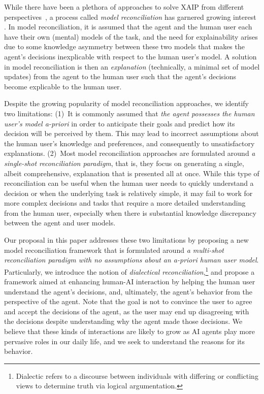 \documentclass{ecai}
\begin{document}
While there have been a plethora of approaches to solve XAIP from different perspectives~\cite{chakraborti2020emerging}, a process called \emph{model reconciliation} has garnered growing interest \cite{chakraborti2017plan, sreedharan2018handling, ijcai2019, son2021model, vas21, vasileioulogic}. In model reconciliation, it is assumed that the agent and the human user each have their own (mental) models of the task, and the need for explainability arises due to some knowledge asymmetry between these two models that makes the agent's decisions inexplicable with respect to the human user's model. A solution in model reconciliation is then an \emph{explanation} (technically, a minimal set of model updates) from the agent to the human user such that the agent's decisions become explicable to the human user.

Despite the growing popularity of model reconciliation approaches, we identify two limitations: (1)~It is commonly assumed that \emph{the agent possesses the human user's model a-priori} in order to anticipate their goals and predict how its decision will be perceived by them. This may lead to incorrect assumptions about the human user's knowledge and preferences, and consequently to unsatisfactory explanations. (2)~Most model reconciliation approaches are formulated around \emph{a single-shot reconciliation paradigm}, that is, they focus on generating a single, albeit comprehensive, explanation that is presented all at once. While this type of reconciliation can be useful when the human user needs to quickly understand a decision or when the underlying task is relatively simple, it may fail to work for more complex decisions and tasks that require a more detailed understanding from the human user, especially when there is substantial knowledge discrepancy between the agent and user models.

Our proposal in this paper addresses these two limitations by proposing a new model reconciliation framework that is formulated around \emph{a multi-shot reconciliation paradigm with no assumptions about an a-priori human user model}. Particularly, we introduce the notion of \emph{dialectical reconciliation},\footnote{Dialectic refers to a discourse between individuals with differing or conflicting views to determine truth via logical argumentation.} and propose a framework aimed at enhancing human-AI interaction by helping the human user understand the agent's decisions, and, ultimately, the agent's behavior from the perspective of the agent. Note that the goal is not to convince the user to agree and accept the decisions of the agent, as the user may end up disagreeing with the decisions despite understanding why the agent made those decisions. We believe that these kinds of interactions are likely to grow as AI agents play more pervasive roles in our daily life, and we seek to understand the reasons for its behavior. 
\end{document}
